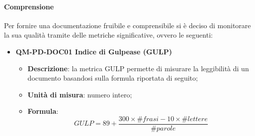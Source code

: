             \paragraph{Comprensione}
                Per fornire una documentazione fruibile e comprensibile si è deciso di monitorare la sua qualità tramite delle metriche significative, ovvero le seguenti:\\
                \begin{itemize}
                    \item\textbf{QM-PD-DOC01 Indice di Gulpease (GULP)}
                        \begin{itemize}
                            \item\textbf{Descrizione}: la metrica GULP permette di misurare la leggibilità di un documento basandosi sulla formula riportata di seguito;
                            \item\textbf{Unità di misura}: numero intero;
                            \item\textbf{Formula}: \\
                                \[GULP = 89+ \frac{300\times\#\mathit{frasi} -10\times\#lettere}{\#parole}\]
                                

\end{itemize}
\end{itemize}
